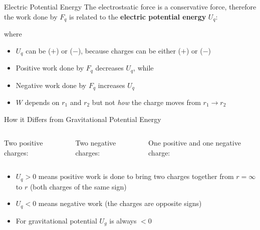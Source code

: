\documentclass[12pt,aspectratio=169]{beamer}
\begin{document}
\begin{frame}{Electric Potential Energy}
  The electrostsatic force is a conservative force, therefore the work done
  by $F_q$ is related to the \textbf{electric potential energy} $U_q$:
  

  where
    
  \begin{itemize}
  \item $U_q$ can be ($+$) or ($-$), because charges can be either ($+$) or
    ($-$)
  \item Positive work done by $F_q$ decreases $U_q$, while
  \item Negative work done by $F_q$ increases $U_q$
  \item $W$ depends on $r_1$ and $r_2$ but not \emph{how} the charge moves from
    $r_1\rightarrow r_2$
  \end{itemize}
\end{frame}



\begin{frame}{How it Differs from Gravitational Potential Energy}
  \begin{columns}
    \centering
    Two positive charges:

    
    \centering
    Two negative charges:

    
    \centering
    One positive and one negative charge:

  \end{columns}
  \begin{itemize}
  \item $U_q>0$ means positive work is done to bring two charges together from
   $r=\infty$ to $r$ (both charges of the same sign)
  \item $U_q<0$ means negative work (the charges are opposite signs)
  \item For gravitational potential $U_g$ is always $<0$
  \end{itemize}
\end{frame}
\end{document}
